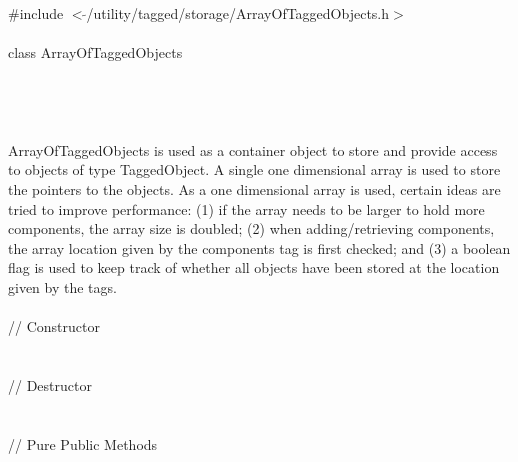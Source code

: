 
   \\
\indent \#include $<\tilde{ }$/utility/tagged/storage/ArrayOfTaggedObjects.h$>$ \\

  \\
\indent class ArrayOfTaggedObjects  \\

 \\
 \\
\indent{} \\

  \\
\indent ArrayOfTaggedObjects is used as a container object to store and
provide access to objects of type TaggedObject. A single one dimensional
array is used to store the pointers to the objects. As a one dimensional
array is used, certain ideas are tried to improve performance: (1) if
the array needs to be larger to hold more components, the array size
is doubled; (2) when adding/retrieving components, the array location
given by the components tag is first checked; and (3) a boolean flag is
used to keep track of whether all objects have been stored at the
location given by the tags.\\

  \\
\indent // Constructor  \\
 \\\\
\indent // Destructor \\
 \\  \\
\indent // Pure Public Methods \\
\\
\\
\\
\\
\\
\\
\\
\\
\\

